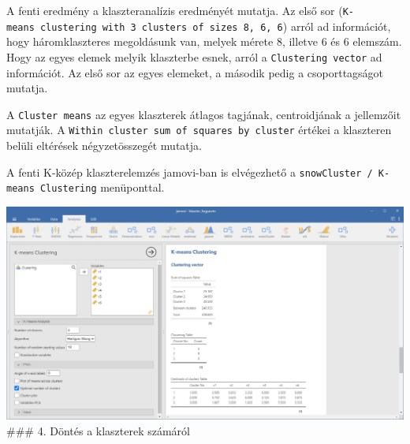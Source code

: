 \documentclass[
  letterpaper,
]{krantz}
\makeatletter
\newenvironment{Shaded}{\begin{snugshade}}{\end{snugshade}}
\newcommand{\CommentTok}[1]{\textcolor[rgb]{0.37,0.37,0.37}{#1}}
\newcommand{\FunctionTok}[1]{\textcolor[rgb]{0.28,0.35,0.67}{#1}}
\newcommand{\NormalTok}[1]{\textcolor[rgb]{0.00,0.23,0.31}{#1}}
\newcommand{\OtherTok}[1]{\textcolor[rgb]{0.00,0.23,0.31}{#1}}
\newcommand{\SpecialCharTok}[1]{\textcolor[rgb]{0.37,0.37,0.37}{#1}}
\newenvironment{kframe}{%
\medskip{}
\setlength{\fboxsep}{.8em}
 \def\at@end@of@kframe{}%
 \ifinner\ifhmode%
  \def\at@end@of@kframe{\end{minipage}}%
  \begin{minipage}{\columnwidth}%
 \fi\fi%
 \def\FrameCommand##1{\hskip\@totalleftmargin \hskip-\fboxsep
 \colorbox{shadecolor}{##1}\hskip-\fboxsep
     \hskip-\linewidth \hskip-\@totalleftmargin \hskip\columnwidth}%
 \MakeFramed {\advance\hsize-\width
   \@totalleftmargin\z@ \linewidth\hsize
   \@setminipage}}%
 {\par\unskip\endMakeFramed%
 \at@end@of@kframe}
\renewenvironment{Shaded}{\begin{kframe}}{\end{kframe}}
\makeatother
\begin{document}
\begin{Shaded}
\end{Shaded}

A fenti eredmény a klaszteranalízis eredményét mutatja. Az első sor
(\texttt{K-means\ clustering\ with\ 3\ clusters\ of\ sizes\ 8,\ 6,\ 6})
arról ad információt, hogy háromklaszteres megoldásunk van, melyek
mérete 8, illetve 6 és 6 elemszám. Hogy az egyes elemek melyik
klaszterbe esnek, arról a \texttt{Clustering\ vector} ad információt. Az
első sor az egyes elemeket, a második pedig a csoporttagságot mutatja.

A \texttt{Cluster\ means} az egyes klaszterek átlagos tagjának,
centroidjának a jellemzőit mutatják. A
\texttt{Within\ cluster\ sum\ of\ squares\ by\ cluster} értékei a
klaszteren belüli eltérések négyzetösszegét mutatja.

A fenti K-közép klaszterelemzés jamovi-ban is elvégezhető a
\texttt{snowCluster\ /\ K-means\ Clustering} menüponttal.

\includegraphics{./images/klaszter_fogyaszto_03.jpg} \#\#\# 4. Döntés a
klaszterek számáról
\end{document}
